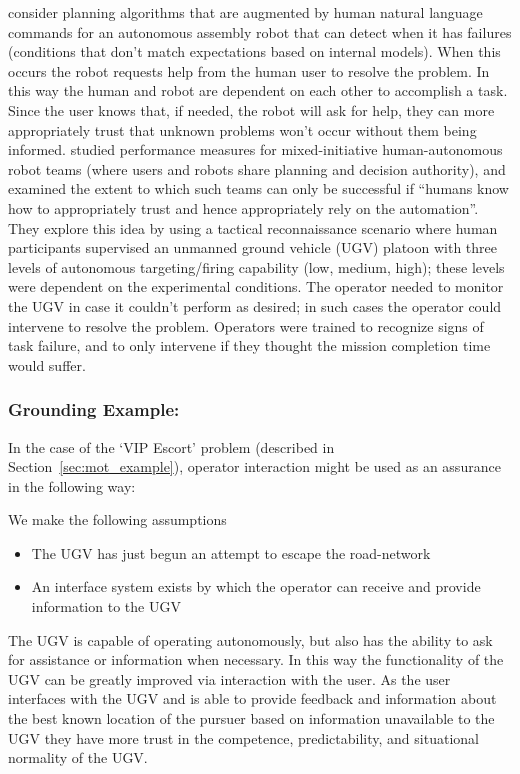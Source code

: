 \citet{Tellex2014-uc} consider planning algorithms that are augmented by human natural language commands for an autonomous assembly robot that can detect when it has failures (conditions that don't match expectations based on internal models). When this occurs the robot requests help from the human user to resolve the problem. In this way the human and robot are dependent on each other to accomplish a task. Since the user knows that, if needed, the robot will ask for help, they can more appropriately trust that unknown problems won't occur without them being informed.
%
\citet{Freedy2007-sg} studied performance measures for  mixed-initiative human-autonomous robot teams (where users and robots share planning and decision authority), and examined the extent to which such teams can only be successful if ``humans know how to appropriately trust and hence appropriately rely on the automation''. They explore this idea by using a tactical reconnaissance scenario where human participants supervised an unmanned ground vehicle (UGV)  platoon with three levels of autonomous targeting/firing capability (low, medium, high); these levels were dependent on the experimental conditions. The operator needed to monitor the UGV in case it couldn't perform as desired; in such cases the operator could intervene to resolve the problem. Operators were trained to recognize signs of task failure, and to only intervene if they thought the mission completion time would suffer. 

\subsubsection{Grounding Example:}
In the case of the `VIP Escort' problem (described in Section~\ref{sec:mot_example}), operator interaction might be used as an assurance in the following way:

We make the following assumptions

\begin{itemize}
    \item The UGV has just begun an attempt to escape the road-network
    \item An interface system exists by which the operator can receive and provide information to the UGV
\end{itemize}

The UGV is capable of operating autonomously, but also has the ability to ask for assistance or information when necessary. In this way the functionality of the UGV can be greatly improved via interaction with the user. As the user interfaces with the UGV and is able to provide feedback and information about the best known location of the pursuer based on information unavailable to the UGV they have more trust in the competence, predictability, and situational normality of the UGV.

